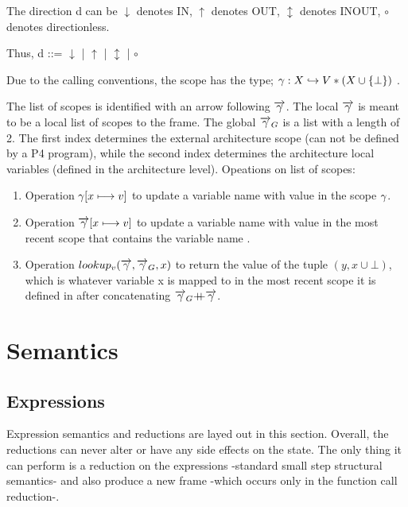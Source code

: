 \documentclass[UTF8]{article}
\begin{document}
The direction d can be $\downarrow$ denotes IN, $\uparrow$ denotes OUT, $\updownarrow$ denotes INOUT, $\circ$ denotes directionless. 

Thus,
d ::= $\downarrow$ | $\uparrow$ | $\updownarrow$ | $\circ$

Due to the calling conventions, the scope has the type; $ \gamma : X \hookrightarrow V * (X \cup \{ \bot \})  $ .

The list of scopes is identified with an arrow following $\overrightarrow{\gamma}$.
The local $\overrightarrow{\gamma}$ is meant to be a local list of scopes to the frame. The global $\overrightarrow{\gamma}_G$ is a list with a length of 2. The first index determines the external architecture scope (can not be defined by a P4 program), while the second index determines the architecture local variables (defined in the architecture level).
Opeations on list of scopes:
\begin{enumerate}
    \setlength{\itemsep}{1pt}
    \setlength{\parskip}{0pt}
    \setlength{\parsep}{0pt}
\item Operation $\gamma [x \longmapsto v]$ to update a variable name \vn{} with value \cval{} in the scope $\gamma$. 
\item Operation $\overrightarrow{\gamma} [x \longmapsto v]$ to update a variable name \vn{} with value \cval{} in the most recent scope that contains the variable name \vn{}.   
\item Operation $lookup_v(\overrightarrow{\gamma}, \overrightarrow{\gamma}_G, x)$ to return the value \cval{} of the tuple $(y, x \cup {\bot})$, which is whatever variable x is mapped to in the most recent scope it is defined in after concatenating $\overrightarrow{\gamma}_G {+}\mspace{-8mu}{+} \overrightarrow{\gamma}$. 
\end{enumerate}







\newpage

\section{Semantics}

\subsection{Expressions}
Expression semantics and reductions are layed out in this section. Overall, the reductions can never alter or have any side effects on the state. The only thing it can perform is a reduction on the expressions -standard small step structural semantics- and also produce a new frame -which occurs only in the function call reduction-.  
\end{document}
